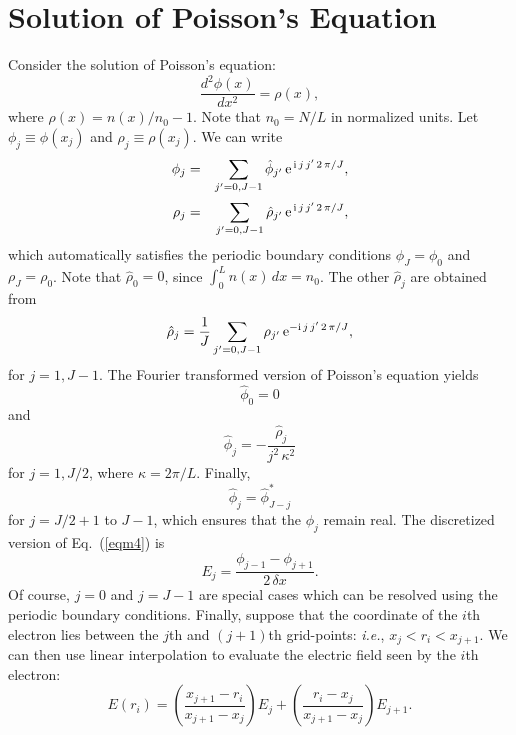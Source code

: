 \section{Solution of Poisson's Equation}
Consider the solution of Poisson's equation:
\begin{equation}
\frac{d^2\phi(x)}{dx^2} = \rho(x),
\end{equation}
where $\rho(x) = n(x)/n_0-1$. Note that $n_0 = N/L$ in normalized
units. Let $\phi_j\equiv\phi(x_j)$ and $\rho_j\equiv
\rho(x_j)$. 
We can write
\begin{eqnarray}
\phi_j &=& \sum_{j'=0,J-1}\hat{\phi}_{j'} \,{\rm e}^{\,{\rm i}\,j\,j'\,2\,\pi/J},\\[0.5ex]
\rho_j &=& \sum_{j'=0,J-1}\hat{\rho}_{j'} \,{\rm e}^{\,{\rm i}\,j\,j'\,2\,\pi/J},
\end{eqnarray}
which automatically satisfies the periodic boundary conditions $\phi_J=\phi_0$ and $\rho_J=\rho_0$. 
Note that $\hat{\rho}_0=0$, since $\int_0^L n(x)\,dx = n_0$. The other $\hat{\rho}_j$ are obtained
from
\begin{equation}
\hat{\rho}_j = \frac{1}{J}\sum_{j'=0,J-1}\rho_{j'} \,{\rm e}^{-{\rm i}\,j\,j'\,2\,\pi/J},
\end{equation}
for $j=1,J-1$.
The Fourier transformed version of Poisson's equation yields
\begin{equation}
\hat{\phi}_0 = 0
\end{equation}
and
\begin{equation}
\hat{\phi}_j = - \frac{\hat{\rho}_j}{j^2\,\kappa^2}
\end{equation}
for $j=1,J/2$, where $\kappa = 2\pi / L$. Finally,
\begin{equation}
\hat{\phi}_j = \hat{\phi}^\ast_{J-j}
\end{equation}
for $j=J/2+1$ to $J-1$, which ensures that the $\phi_j$ remain real.
The discretized version of Eq.~(\ref{eqm4}) is
\begin{equation}
E_j = \frac{\phi_{j-1}-\phi_{j+1}}{2\,\delta x}.
\end{equation}
Of course, $j=0$ and $j=J-1$ are special cases which can be resolved using the periodic
boundary conditions.
Finally, suppose that the coordinate of the $i$th electron lies between the $j$th and $(j+1)$th
grid-points: {\em i.e.}, $x_j < r_i < x_{j+1}$.  We can then use linear interpolation to
evaluate the electric field seen by the $i$th electron:
\begin{equation}
E(r_i) = \left(\frac{x_{j+1}-r_i}{x_{j+1}-x_j}\right)E_j+\left(\frac{r_i - x_j}{x_{j+1}-x_j}\right)
E_{j+1}.
\end{equation}

